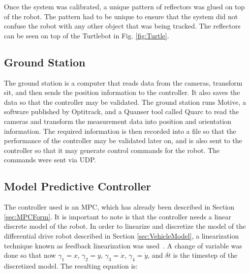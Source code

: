 \documentclass[conference]{IEEEtran}
\begin{document}
Once the system was calibrated, a unique pattern of reflectors was glued on top of the robot. The pattern had to be unique to ensure that the system did not confuse the robot with any other object that was being tracked. The reflectors can be seen on top of the Turtlebot in Fig. \ref{fig:Turtle}.

\subsection{Ground Station}
The ground station is a computer that reads data from the cameras, transform sit, and then sends the position information to the controller. It also saves the data so that the controller may be validated. The ground station runs Motive, a software published by Optitrack, and a Quanser tool called Quarc to read the cameras and transform the measurement data into position and orientation information. The required information is then recorded into a file so that the performance of the controller may be validated later on, and is also sent to the controller so that it may generate control commands for the robot. The commands were sent via UDP.

\subsection{Model Predictive Controller}
The controller used is an MPC, which has already been described in Section \ref{sec:MPCForm}. It is important to note is that the controller needs a linear discrete model of the robot. In order to linearize and discretize the model of the differential drive robot described in Section \ref{sec:VehicleModel}, a linearization technique known as feedback linearization was used~\cite{he:2005}. A change of variable was done so that now $\gamma_{1} = x$, $\gamma_{2} = y$, $\gamma_{3} = \dot{x}$, $\gamma_{4} = \dot{y}$, and $\delta t$ is the timestep of the discretized model. The resulting equation is: 
\end{document}

